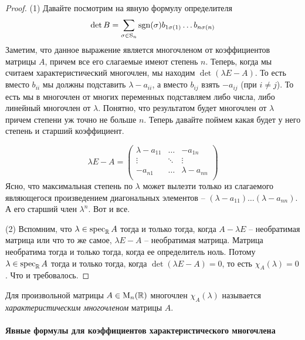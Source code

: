 \begin{proof}
(1) Давайте посмотрим на явную формулу определителя
\[
\det B = \sum_{\sigma\in\operatorname{S}_{n}}\operatorname{sgn}(\sigma) b_{1\sigma(1)}\ldots b_{n\sigma(n)}
\]
Заметим, что данное выражение является многочленом от коэффициентов матрицы $A$, причем все его слагаемые имеют степень $n$.
Теперь, когда мы считаем характеристический многочлен, мы находим $\det(\lambda E - A)$.
То есть вместо $b_{ii}$ мы должны подставить  $\lambda - a_{ii}$, а вместо $b_{ij}$ взять $-a_{ij}$ (при $i\neq j$).
То есть мы в многочлен от многих переменных подставляем либо числа, либо линейный многочлен от $\lambda$.
Понятно, что результатом будет многочлен от $\lambda$ причем степени уж точно не больше $n$.
Теперь давайте поймем какая будет у него степень и старший коэффициент.

\[
\lambda E - A = 
\begin{pmatrix}
{\lambda - a_{11}}&{\ldots}&{-a_{1n}}\\
{\vdots}&{\ddots}&{\vdots}\\
{-a_{n1}}&{\ldots}&{\lambda - a_{nn}}\\
\end{pmatrix}
\]
Ясно, что максимальная степень по $\lambda$ может вылезти только из слагаемого являющегося произведением диагональных элементов -- $(\lambda - a_{11}) \ldots (\lambda - a_{nn})$.
А его старший член $\lambda^n$.
Вот и все.

(2) Вспомним, что $\lambda\in\operatorname{spec}_\mathbb R A$ тогда и только тогда, когда $A - \lambda E$ -- необратимая матрица или что то же самое,  $\lambda E - A$ -- необратимая матрица.
Матрица необратима тогда и только тогда, когда ее определитель ноль.
Потому $\lambda \in\operatorname{spec}_\mathbb R A$ тогда и только тогда, когда $\det (\lambda E - A) = 0$, то есть $\chi_A(\lambda) = 0$.
Что и требовалось.
\end{proof}

\begin{definition}
\label{def::CharPoly}
Для произвольной матрицы $A\in\operatorname{M}_{n}(\mathbb R)$ многочлен $\chi_A(\lambda)$ называется {\it характеристическим многочленом} матрицы $A$.
\end{definition}

\paragraph{Явные формулы для коэффициентов характеристического многочлена}


